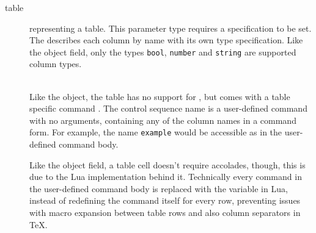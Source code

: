 \documentclass{ltxdoc}
\newcommand\showexample[5][15pt]{%
\begin{minipage}[t]{.5\linewidth - .5 \columnsep}%

\end{minipage}\hspace*{\columnsep}%
\begin{minipage}[t]{.5\linewidth - .5 \columnsep}%

\end{minipage}\\%
}
\begin{document}
\begin{description}
        \item[table] representing a table.
        This parameter type requires a  specification to be set.
        The  describes each column by name with its own type specification.
        Like the object field, only the types \texttt{bool}, \texttt{number} and \texttt{string} are supported column types.\\
        \showexample[20pt]{28}{28-36}{11}{11-15}
        \DescribeMacro{\fortablerow}
        Like the object, the table has no support for \cmd{\param}, but comes with a table specific command \cmd{\fortablerow}.
        The control sequence name  is a user-defined command with no arguments, containing any of the column names in a command form.
        For example, the name \texttt{example} would be accessible as \cmd{\example} in the user-defined command body.

        Like the object field, a table cell doesn't require accolades, though, this is due to the Lua implementation behind it.
        Technically every command in the user-defined command body is replaced with the variable in Lua, instead of redefining the command itself for every row, preventing issues with macro expansion between table rows and also column separators in \TeX{}.

    \end{description}

    \clearpage
    \addtolength\textwidth{2cm}%
    \setlength\linewidth{\textwidth}%
    \addtolength\oddsidemargin{-2cm}%
    \addtolength\evensidemargin{-1cm}%

    \printbibliography[heading=bibnumbered]
\end{document}
